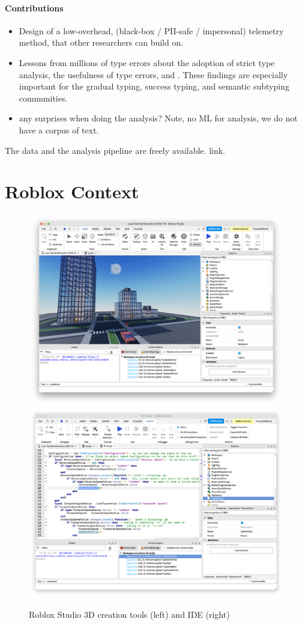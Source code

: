 \documentclass[english,submission,cleveref]{programming}
\begin{document}
\paragraph{Contributions}
\begin{itemize}
  \item
    Design of a low-overhead, (black-box / PII-safe / impersonal)
    telemetry method, that other
    researchers can build on.

  \item
    Lessons from millions of type errors about
    the adoption of strict type analysis,
    the usefulness of type errors,
    and \FILL{}.
    These findings are especially important for the
    gradual typing, success typing, and semantic subtyping communities.

  \item
    \FILL{} any surprises when doing the analysis?
    Note, no ML for analysis, we do not have a corpus of text.

\end{itemize}

The data and the analysis pipeline are freely available.
\FILL{} link.


\section{{Roblox} Context}

\begin{figure}[t]\centering
  \includegraphics[width=.45\textwidth]{img/roblox-studio.png}
  \includegraphics[width=.45\textwidth]{img/roblox-studio-ide.png}

  \caption{{Roblox Studio 3D creation} tools (left) and IDE (right)}
  \label{fig:roblox-studio}
\end{figure}
\end{document}
